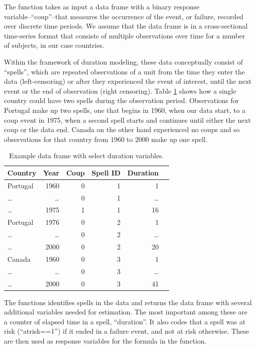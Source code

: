 \documentclass[article]{jss}
\begin{document}
The  function takes as input a data frame with a
binary response variable--``coup''--that measures the occurrence of the
event, or failure, recorded over discrete time periods. We assume that
the data frame is in a cross-sectional time-series format that consists
of multiple observations over time for a number of subjects, in our case
countries.

Within the framework of duration modeling, these data conceptually
consist of ``spells'', which are repeated observations of a unit from
the time they enter the data (left-censoring) or after they experienced
the event of interest, until the next event or the end of observation
(right censoring). Table \ref{tab-ex} shows how a single country could
have two spells during the observation period. Observations for Portugal
make up two spells, one that begins in 1960, when our data start, to a
coup event in 1975, when a second spell starts and continues until
either the next coup or the data end. Canada on the other hand
experienced no coups and so observations for that country from 1960 to
2000 make up one spell.

\begin{table}
\begin{center}
\begin{tabular}{lrrrrr} \toprule
Country & Year & Coup & Spell ID & Duration \\ \midrule
Portugal & 1960 & 0 & 1 & 1  \\ 
\ldots & \ldots & 0 & 1 & \ldots \\
\ldots & 1975 & 1 & 1 & 16 \\ \midrule
Portugal & 1976 & 0 & 2 & 1 \\
\ldots & \ldots & 0 & 2 & \ldots \\
\ldots & 2000 & 0 & 2 & 20  \\ \midrule
Canada & 1960 & 0 & 3 & 1 \\
\ldots & \ldots & 0 & 3 & \ldots \\ 
\ldots & 2000 & 0 & 3 & 41 \\ \bottomrule
\end{tabular}
\end{center}
\caption{Example data frame with select duration variables.} \label{tab-ex}
\end{table}

The  functions identifies spells in the data and
returns the data frame with several additional variables needed for
estimation. The most important among these are a counter of elapsed time
in a spell, ``duration''. It also codes that a spell was at risk
(``atrisk==1'') if it ended in a failure event, and not at risk
otherwise. These are then used as response variables for the formula in
the  function.
\end{document}
